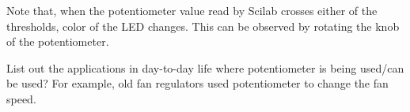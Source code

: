 Note that, when the potentiometer value read by Scilab crosses either
of the thresholds, color of the LED changes. This can be observed by
rotating the knob of the potentiometer.

\begin{exercise}
List out the applications in day-to-day life where potentiometer is
being used/can be used? For example, old fan regulators used
potentiometer to change the fan speed.
\end{exercise}

